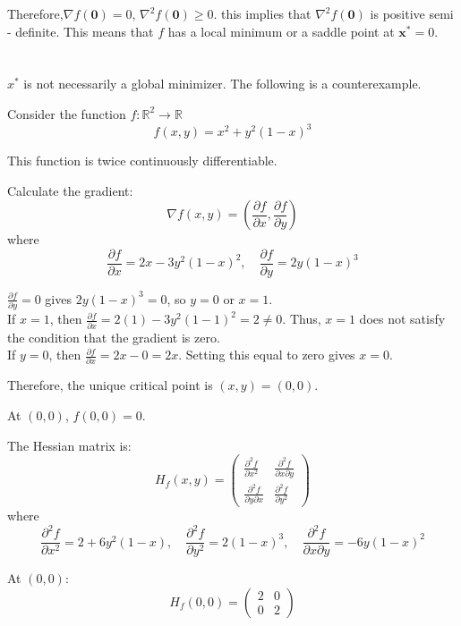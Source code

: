\documentclass{article}
\begin{document}
Therefore,$ \nabla f(\mathbf{0})=0$, $\nabla^2  f(\mathbf{0}) \geq 0$. this implies that $ \nabla^2 f(\mathbf{0}) $ is positive semi - definite. This means that $ f $ has a local minimum or a saddle point at $ \mathbf{x}^* = 0 $.

\section{}

\( x^* \) is not necessarily a global minimizer. The following is a counterexample.

Consider the function \( f: \mathbb{R}^2 \to \mathbb{R} \)
$$f(x, y) = x^2 + y^2(1 - x)^3$$

This function is twice continuously differentiable.

Calculate the gradient:
$$
\nabla f(x, y) = \left( \frac{\partial f}{\partial x}, \frac{\partial f}{\partial y} \right)
$$
where
$$\frac{\partial f}{\partial x} = 2x - 3y^2(1 - x)^2, \quad \frac{\partial f}{\partial y} = 2y(1 - x)^3
$$

\( \frac{\partial f}{\partial y} = 0 \) gives \( 2y(1 - x)^3 = 0 \), so \( y = 0 \) or \( x = 1 \).\\
If \( x = 1 \), then \( \frac{\partial f}{\partial x} = 2(1) - 3y^2(1 - 1)^2 = 2 \neq 0 \). Thus, \( x = 1 \) does not satisfy the condition that the gradient is zero.\\
If \( y = 0 \), then \( \frac{\partial f}{\partial x} = 2x - 0 = 2x \). Setting this equal to zero gives \( x = 0 \).

Therefore, the unique critical point is \( (x, y) = (0, 0) \).


At \( (0, 0) \), \( f(0, 0) = 0 \).

The Hessian matrix is:
$$
H_f(x, y) = \begin{pmatrix}
	\frac{\partial^2 f}{\partial x^2} & \frac{\partial^2 f}{\partial x \partial y} \\
	\frac{\partial^2 f}{\partial y \partial x} & \frac{\partial^2 f}{\partial y^2}
\end{pmatrix}
$$
where
$$
\frac{\partial^2 f}{\partial x^2} = 2 + 6y^2(1 - x), \quad \frac{\partial^2 f}{\partial y^2} = 2(1 - x)^3, \quad \frac{\partial^2 f}{\partial x \partial y} = -6y(1 - x)^2
$$

At \( (0, 0) \):
$$
H_f(0, 0) = \begin{pmatrix}
	2 & 0 \\
	0 & 2
\end{pmatrix}
$$
\end{document}
